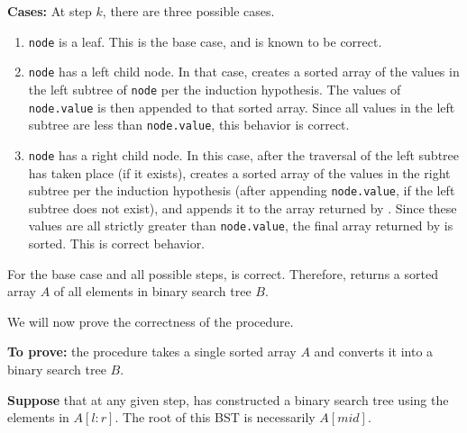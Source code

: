 \documentclass[11pt]{article}
\begin{document}
\textbf{Cases:} At step $k$, there are three possible cases.
\begin{enumerate}
    \item \texttt{node}  is a leaf. This is the base case, and is known to be
        correct.
    \item \texttt{node} has a left child node. In that case, 
        creates a sorted array of the values in the left subtree of \texttt{node} 
        per the induction hypothesis. The values of \texttt{node.value} is then
        appended to that sorted array. Since all values in the left subtree are
        less than \texttt{node.value}, this behavior is correct.
    \item \texttt{node} has a right child node. In this case, after the traversal of the left subtree has taken place (if it exists),  creates a sorted array of the values in the right subtree per the induction hypothesis (after appending \texttt{node.value}, if the left subtree does not exist), and appends it to the array returned by . Since these values are all strictly greater than \texttt{node.value}, the final array returned by  is sorted. This is correct behavior.
\end{enumerate}

For the base case and all possible steps,  is correct.
Therefore,  returns a sorted array $A$ of all elements in
binary search tree $B$.

We will now prove the correctness of the  procedure. 

\textbf{To prove:} the  procedure takes a single sorted
array $A$ and converts it into a binary search tree $B$.

\textbf{Suppose} that at any given step,  has constructed a
binary search tree using the elements in $A[l:r]$. The root of this BST is
necessarily $A[mid]$.
\end{document}
